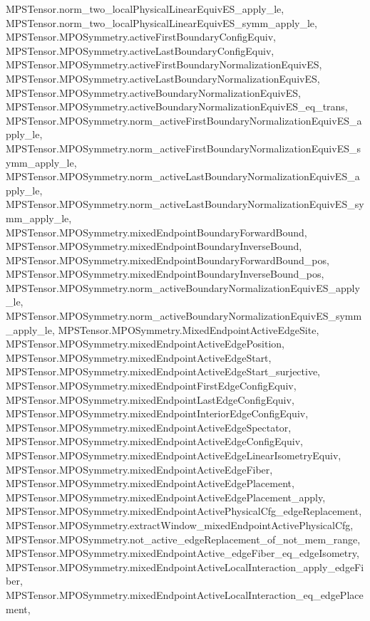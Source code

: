 \begin{lemma}
{        MPSTensor.norm_two_localPhysicalLinearEquivES_apply_le,
        MPSTensor.norm_two_localPhysicalLinearEquivES_symm_apply_le,
        MPSTensor.MPOSymmetry.activeFirstBoundaryConfigEquiv,
        MPSTensor.MPOSymmetry.activeLastBoundaryConfigEquiv,
        MPSTensor.MPOSymmetry.activeFirstBoundaryNormalizationEquivES,
        MPSTensor.MPOSymmetry.activeLastBoundaryNormalizationEquivES,
        MPSTensor.MPOSymmetry.activeBoundaryNormalizationEquivES,
        MPSTensor.MPOSymmetry.activeBoundaryNormalizationEquivES_eq_trans,
        MPSTensor.MPOSymmetry.norm_activeFirstBoundaryNormalizationEquivES_apply_le,
        MPSTensor.MPOSymmetry.norm_activeFirstBoundaryNormalizationEquivES_symm_apply_le,
        MPSTensor.MPOSymmetry.norm_activeLastBoundaryNormalizationEquivES_apply_le,
        MPSTensor.MPOSymmetry.norm_activeLastBoundaryNormalizationEquivES_symm_apply_le,
        MPSTensor.MPOSymmetry.mixedEndpointBoundaryForwardBound,
        MPSTensor.MPOSymmetry.mixedEndpointBoundaryInverseBound,
        MPSTensor.MPOSymmetry.mixedEndpointBoundaryForwardBound_pos,
        MPSTensor.MPOSymmetry.mixedEndpointBoundaryInverseBound_pos,
        MPSTensor.MPOSymmetry.norm_activeBoundaryNormalizationEquivES_apply_le,
        MPSTensor.MPOSymmetry.norm_activeBoundaryNormalizationEquivES_symm_apply_le,
        MPSTensor.MPOSymmetry.MixedEndpointActiveEdgeSite,
        MPSTensor.MPOSymmetry.mixedEndpointActiveEdgePosition,
        MPSTensor.MPOSymmetry.mixedEndpointActiveEdgeStart,
        MPSTensor.MPOSymmetry.mixedEndpointActiveEdgeStart_surjective,
        MPSTensor.MPOSymmetry.mixedEndpointFirstEdgeConfigEquiv,
        MPSTensor.MPOSymmetry.mixedEndpointLastEdgeConfigEquiv,
        MPSTensor.MPOSymmetry.mixedEndpointInteriorEdgeConfigEquiv,
        MPSTensor.MPOSymmetry.mixedEndpointActiveEdgeSpectator,
        MPSTensor.MPOSymmetry.mixedEndpointActiveEdgeConfigEquiv,
        MPSTensor.MPOSymmetry.mixedEndpointActiveEdgeLinearIsometryEquiv,
        MPSTensor.MPOSymmetry.mixedEndpointActiveEdgeFiber,
        MPSTensor.MPOSymmetry.mixedEndpointActiveEdgePlacement,
        MPSTensor.MPOSymmetry.mixedEndpointActiveEdgePlacement_apply,
        MPSTensor.MPOSymmetry.mixedEndpointActivePhysicalCfg_edgeReplacement,
        MPSTensor.MPOSymmetry.extractWindow_mixedEndpointActivePhysicalCfg,
        MPSTensor.MPOSymmetry.not_active_edgeReplacement_of_not_mem_range,
        MPSTensor.MPOSymmetry.mixedEndpointActive_edgeFiber_eq_edgeIsometry,
        MPSTensor.MPOSymmetry.mixedEndpointActiveLocalInteraction_apply_edgeFiber,
        MPSTensor.MPOSymmetry.mixedEndpointActiveLocalInteraction_eq_edgePlacement,
}
\end{lemma}
